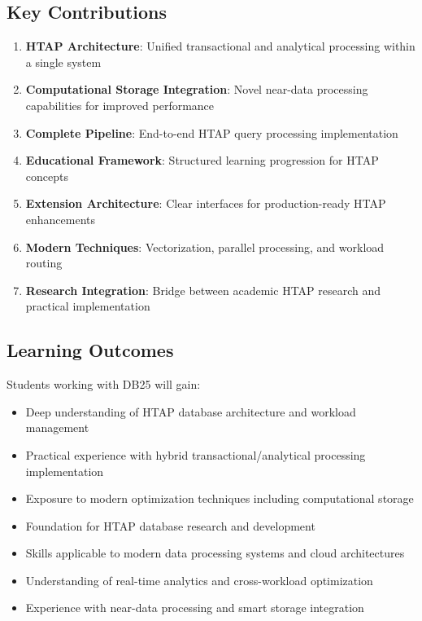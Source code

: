 \documentclass[12pt,a4paper]{article}
\begin{document}
    \subsection{Key Contributions}

    \begin{enumerate}
        \item \textbf{HTAP Architecture}: Unified transactional and analytical processing within a single system
        \item \textbf{Computational Storage Integration}: Novel near-data processing capabilities for improved performance
        \item \textbf{Complete Pipeline}: End-to-end HTAP query processing implementation
        \item \textbf{Educational Framework}: Structured learning progression for HTAP concepts
        \item \textbf{Extension Architecture}: Clear interfaces for production-ready HTAP enhancements
        \item \textbf{Modern Techniques}: Vectorization, parallel processing, and workload routing
        \item \textbf{Research Integration}: Bridge between academic HTAP research and practical implementation
    \end{enumerate}

    \subsection{Learning Outcomes}

    Students working with DB25 will gain:

    \begin{itemize}
        \item Deep understanding of HTAP database architecture and workload management
        \item Practical experience with hybrid transactional/analytical processing implementation
        \item Exposure to modern optimization techniques including computational storage
        \item Foundation for HTAP database research and development
        \item Skills applicable to modern data processing systems and cloud architectures
        \item Understanding of real-time analytics and cross-workload optimization
        \item Experience with near-data processing and smart storage integration
    \end{itemize}
\end{document}

